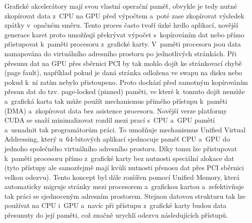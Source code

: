 Grafické akcelerátory mají svou vlastní operační paměť, obvykle je tedy nutné zkopírovat data z~CPU na GPU před výpočtem a~poté zase zkopírovat výsledek zpátky v~opačném směru. Tento proces často tvoří úzké hrdlo aplikací, novější generace karet proto umožňují překrývat výpočet s~kopírováním dat nebo přímo přistupovat k~paměti procesoru z~grafické karty. V~paměti procesoru jsou data namapována do virtuálního adresního prostoru po jednotlivých stránkách. Při přesunu dat na GPU přes sběrnici PCI by tak mohlo dojít ke stránkovací chybě (page fault), například pokud je daná stránka odložena ve swapu na disku nebo pokud k~ní zatím nebylo přistoupeno. Proto dochází před samotným kopírováním přesun dat do tzv. page-locked (pinned) paměti, ve které k~tomuto dojít nemůže a~grafická karta tak může použít mechanismus přímého přístupu k~paměti (DMA) a~zkopírovat data bez asistence procesoru. Novější verze platformy CUDA se snaží minimalizovat rozdíl mezi prací s~CPU a~GPU pamětí a~usnadnit tak programátorům práci. To umožňuje mechanismus Unified Virtual Addressing, který u~64-bitových aplikací sjednocuje paměť CPU a~GPU do jednoho společného virtuálního adresního prostoru. Díky tomu lze přistupovat k~paměti procesoru přímo z~grafické karty bez nutnosti speciální alokace dat (tyto přístupy ale samozřejmě mají kvůli nutnosti přenosu dat přes PCI sběrnici velkou odezvu). Tento koncept byl dále rozšířen pomocí Unified Memory, která automaticky migruje stránky mezi procesorem a~grafickou kartou a~zefektivňuje tak práci se sjednoceným adresním prostorem. Stejnou datovou strukturu tak lze používat na CPU i~GPU a~navíc při přístupu z~grafické karty budou data přesunuty do její paměti, což značně urychlí odezvu následujících přístupů.

